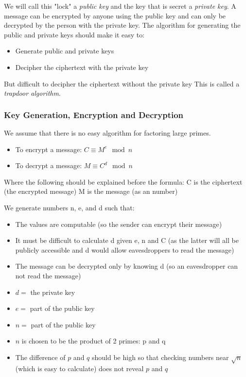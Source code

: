 \documentclass{article}
\begin{document}
We will call this "lock" a \textit{public key} and the key that is secret a
\textit{private key}. A message can be encrypted by anyone using the public key
and can only be decrypted by the person with the private key.
The algorithm for generating the public and private keys should make it easy to:
\begin{itemize}
   \item	Generate public and private keys
   \item Decipher the ciphertext with the private key
\end{itemize}

But difficult to decipher the ciphertext without the private key
This is called a \textit{trapdoor algorithm}.

\subsubsection{Key Generation, Encryption and Decryption}
We assume that there is no easy algorithm for factoring large primes.
\begin{itemize}

   \item To encrypt a message:
      $ C \equiv M^e \mod n $

   \item To decrypt a message:
      $ M \equiv C^d \mod n $

\end{itemize}

Where the following should be explained before the formula:
C is the ciphertext (the encrypted message)
M is the message (as an number)

We generate numbers n, e, and d such that:
\begin{itemize}
   \item The values are computable (so the sender can encrypt their message)
   \item It must be difficult to calculate d given e, n and C (as the latter will all be publicly accessible and d would allow eavesdroppers to read the message)
   \item The message can be decrypted only by knowing d (so an eavesdropper can not read the message)
   \item $d =$ the private key
   \item $e =$ part of the public key
   \item $n =$ part of the public key

   \item $n$ is chosen to be the product of 2 primes: p and q
   \item The difference of $p$ and $q$ should be high so that checking numbers near $\sqrt{n}$ (which is easy to calculate) does not reveal $p$ and $q$
\end{itemize}
\end{document}
